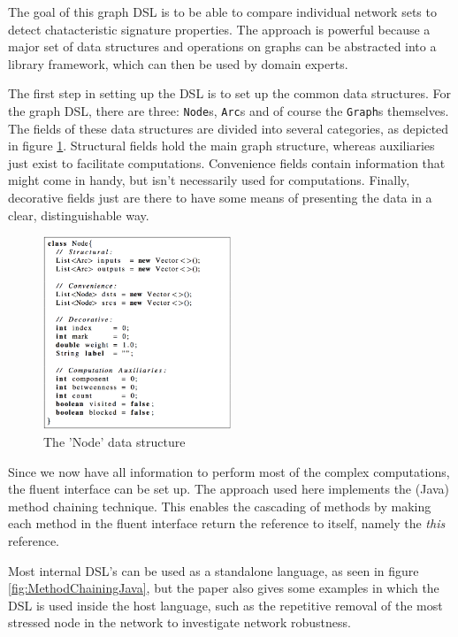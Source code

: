 The goal of this graph DSL is to be able to compare individual network sets to detect chatacteristic signature properties. The approach is powerful because a major set of data structures and operations on graphs can be abstracted into a library framework, which can then be used by domain experts. 

The first step in setting up the DSL is to set up the common data structures. For the graph DSL, there are three: \texttt{Node}s, \texttt{Arc}s and of course the \texttt{Graph}s themselves. The fields of these data structures are divided into several categories, as depicted in figure \ref{fig:DataStructuresJava}. Structural fields hold the main graph structure, whereas auxiliaries just exist to facilitate computations. Convenience fields contain information that might come in handy, but isn't necessarily used for computations. Finally, decorative fields just are there to have some means of presenting the data in a clear, distinguishable way.

\begin{figure}[!ht]
  	\centering
    	\includegraphics[width=0.5\textwidth]{images/DataStructuresJava} 
    	\caption{The 'Node' data structure}
    \label{fig:DataStructuresJava}
\end{figure}

Since we now have all information to perform most of the complex computations, the fluent interface can be set up. The approach used here implements the (Java) method chaining technique. This enables the cascading of methods by making each method in the fluent interface return the reference to itself, namely the \textit{this} reference. 

Most internal DSL's can be used as a standalone language, as seen in figure \ref{fig:MethodChainingJava}, but the paper also gives some examples in which the DSL is used inside the host language, such as the repetitive removal of the most stressed node in the network to investigate network robustness.

